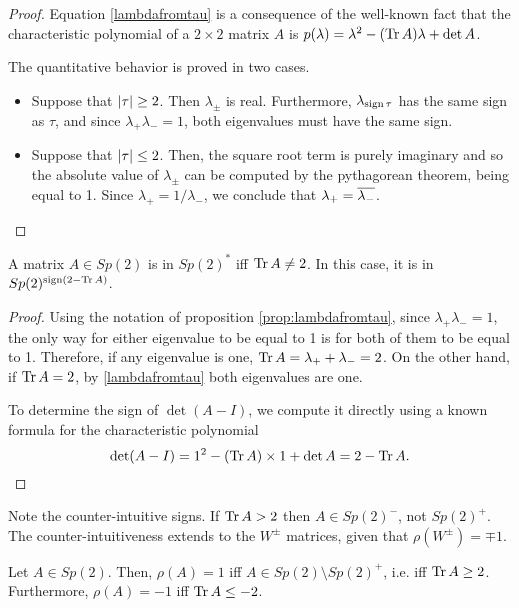 \begin{proof}
Equation \eqref{lambdafromtau} is a consequence of the well-known fact that the characteristic polynomial of a $2 \times 2$ matrix $A$ is $p(\lambda) = \lambda^2 - (\operatorname{Tr} A) \lambda + \det A$.

The quantitative behavior is proved in two cases.
\begin{itemize}
\item Suppose that $\lvert\tau\rvert \geq 2$. Then $\lambda_\pm$ is real. Furthermore, $\lambda_{\operatorname{sign} \tau}$ has the same sign as $\tau$, and since $\lambda_+ \lambda_- = 1$, both eigenvalues must have the same sign.
\item Suppose that $\lvert\tau\rvert \leq 2$. Then, the square root term is purely imaginary and so the absolute value of $\lambda_\pm$ can be computed by the pythagorean theorem, being equal to 1. Since $\lambda_+ = 1/\lambda_-$, we conclude that $\lambda_+ = \overline{\lambda_-}$.
\end{itemize}
\end{proof}

\begin{corollary}\label{sp2sgn}
A matrix $A \in Sp(2)$ is in $Sp(2)^*$ iff $\operatorname{Tr} A \neq 2$. In this case, it is in $Sp(2)^{\operatorname{sign}(2 - \operatorname{Tr} A)}$.
\end{corollary}

\begin{proof}
Using the notation of proposition \ref{prop:lambdafromtau}, since $\lambda_+ \lambda_- = 1$, the only way for either eigenvalue to be equal to 1 is for both of them to be equal to 1. Therefore, if any eigenvalue is one, $\operatorname{Tr} A = \lambda_+ + \lambda_- = 2$. On the other hand, if $\operatorname{Tr} A = 2$, by \eqref{lambdafromtau} both eigenvalues are one.

To determine the sign of $\det(A-I)$, we compute it directly using a known formula for the characteristic polynomial
\begin{equation}
\det(A-I) = 1^2 - (\operatorname{Tr} A) \times 1 + \det A = 2 - \operatorname{Tr} A.
\end{equation}
\end{proof}

\begin{remark}
Note the counter-intuitive signs. If $\operatorname{Tr} A > 2$ then $A \in Sp(2)^-$, not $Sp(2)^+$. The counter-intuitiveness extends to the $W^\pm$ matrices, given that $\rho(W^\pm) = \mp 1$.
\end{remark}

\begin{corollary}\label{sp2pm}
Let $A \in Sp(2)$. Then, $\rho(A) = 1$ iff $A \in Sp(2) \setminus Sp(2)^+$, i.e. iff $\operatorname{Tr} A \geq 2$. Furthermore, $\rho(A) = -1$ iff $\operatorname{Tr} A \leq -2$.
\end{corollary}

